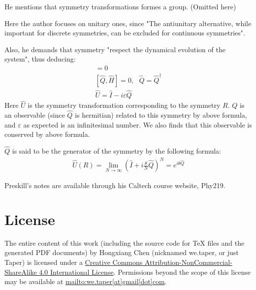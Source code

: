 \documentclass{article}
\numberwithin{equation}{subsection} %
\theoremstyle{definition}
\begin{document}
    He mentions that symmetry transformations formes a group. (Omitted here)

    Here the author focuses on unitary ones, since "The antiunitary
    alternative, while important for discrete symmetries, can be 
    excluded for continuous symmetries".

    Also, he demands that symmetry "respect the dynamical evolution of 
    the system", thus deducing:
    \begin{align}
        [\hat{U}(R),\hat{H}] = 0 \\
        [\hat{Q},\hat{H}] = 0,\text{ }\hat{Q} = \hat{Q}^\dagger \\
        \hat{U} = \hat{I} - i\varepsilon \hat{Q}
    \end{align}
    Here $\hat{U}$ is the symmetry transformation corresponding to the
    symmetry $R$. $Q$ is an observable (since $\hat{Q}$ is hermitian)
    related to this symmetry by above formula, and $\varepsilon$ as
    expected is an infinitesimal number. We also finds that this
    observable is conserved by above formula.

    $\hat{Q}$ is said to be the generator
    of the symmetry by the following formula:
    \begin{align}
        \label{eq:}
        \hat{U}(R) = 
          \lim_{N\to \infty}(\hat{I}+i\frac{\theta}{N}\hat{Q})^N
          = e^{i\theta \hat{Q}}
    \end{align}

\begin{thebibliography}{1}
     Preskill's notes are available through his Caltech
    course website, Phy219.
\end{thebibliography}
\printnomenclature
\section{License}
The entire content of this work (including the source code
for TeX files and the generated PDF documents) by 
Hongxiang Chen (nicknamed we.taper, or just Taper) is
licensed under a 
\href{http://creativecommons.org/licenses/by-nc-sa/4.0/}{Creative 
Commons Attribution-NonCommercial-ShareAlike 4.0 International 
License}. Permissions beyond the scope of this 
license may be available at \url{mailto:we.taper[at]gmail[dot]com}.
\end{document}
